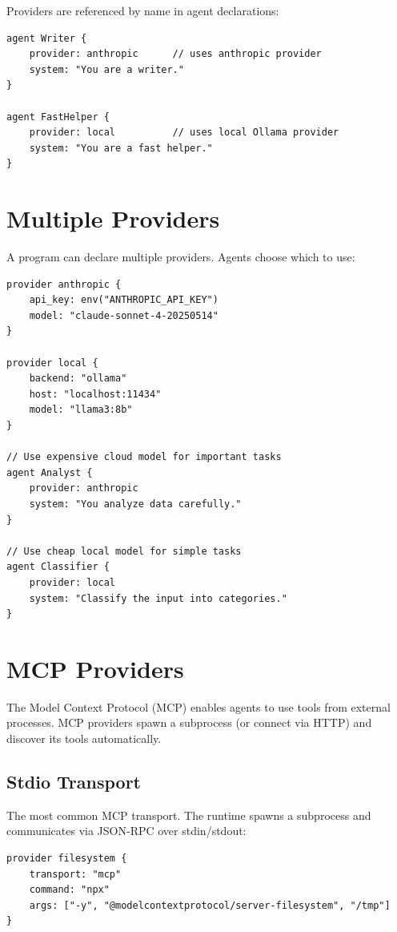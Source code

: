 Providers are referenced by name in agent declarations:

\begin{lstlisting}
agent Writer {
    provider: anthropic      // uses anthropic provider
    system: "You are a writer."
}

agent FastHelper {
    provider: local          // uses local Ollama provider
    system: "You are a fast helper."
}
\end{lstlisting}

\section{Multiple Providers}

A program can declare multiple providers. Agents choose which to use:

\begin{lstlisting}
provider anthropic {
    api_key: env("ANTHROPIC_API_KEY")
    model: "claude-sonnet-4-20250514"
}

provider local {
    backend: "ollama"
    host: "localhost:11434"
    model: "llama3:8b"
}

// Use expensive cloud model for important tasks
agent Analyst {
    provider: anthropic
    system: "You analyze data carefully."
}

// Use cheap local model for simple tasks
agent Classifier {
    provider: local
    system: "Classify the input into categories."
}
\end{lstlisting}

\section{MCP Providers}

The Model Context Protocol (MCP) enables agents to use tools from external processes. MCP providers spawn a subprocess (or connect via HTTP) and discover its tools automatically.

\subsection{Stdio Transport}

The most common MCP transport. The runtime spawns a subprocess and communicates via JSON-RPC over stdin/stdout:

\begin{lstlisting}
provider filesystem {
    transport: "mcp"
    command: "npx"
    args: ["-y", "@modelcontextprotocol/server-filesystem", "/tmp"]
}
\end{lstlisting}

